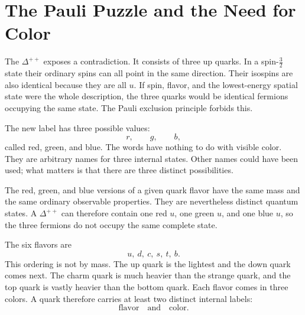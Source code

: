 \begin{classroomqa}
\end{classroomqa}

\section{The Pauli Puzzle and the Need for Color}

The \(\Delta^{++}\) exposes a contradiction. It consists of three up quarks. In a spin-\(\tfrac32\) state their ordinary spins can all point in the same direction. Their isospins are also identical because they are all \(u\). If spin, flavor, and the lowest-energy spatial state were the whole description, the three quarks would be identical fermions occupying the same state. The Pauli exclusion principle forbids this.

\begin{classroomqa}
\end{classroomqa}

The new label has three possible values:
\begin{equation}
r,\qquad g,\qquad b,
\end{equation}
called red, green, and blue. The words have nothing to do with visible color. They are arbitrary names for three internal states. Other names could have been used; what matters is that there are three distinct possibilities.

The red, green, and blue versions of a given quark flavor have the same mass and the same ordinary observable properties. They are nevertheless distinct quantum states. A \(\Delta^{++}\) can therefore contain one red \(u\), one green \(u\), and one blue \(u\), so the three fermions do not occupy the same complete state.

The six flavors are
\begin{equation}
u,\ d,\ c,\ s,\ t,\ b.
\end{equation}
This ordering is not by mass. The up quark is the lightest and the down quark comes next. The charm quark is much heavier than the strange quark, and the top quark is vastly heavier than the bottom quark. Each flavor comes in three colors. A quark therefore carries at least two distinct internal labels:
\begin{equation}
\text{flavor}\quad\text{and}\quad\text{color}.
\end{equation}

